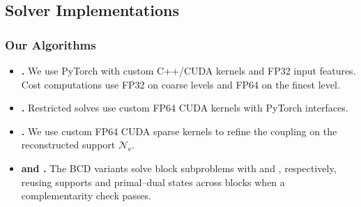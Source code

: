 
\subsection{Solver Implementations}
\label{app:implementation-details}

\subsubsection{Our Algorithms}
\label{app:implementation-shuttle}

\begin{itemize}
\item \textbf{\ours.}
We use PyTorch with custom C++/CUDA kernels and FP32 input features.
Cost computations use FP32 on coarse levels and FP64 on the finest level.

\item \textbf{\subsolver.}
Restricted solves use custom FP64 CUDA kernels with PyTorch interfaces.

\item \textbf{\ourssparsink.}
We use custom FP64 CUDA sparse \sinkhorn kernels to refine the coupling on the reconstructed support $\mathcal{N}_{\mathrm e}$.

\item \textbf{\oursufgw and \ourssinkhornufgw.}
The BCD variants solve block subproblems with \ours and \ourssparsink, respectively, reusing supports and primal--dual states across blocks when a complementarity check passes.
\end{itemize}


